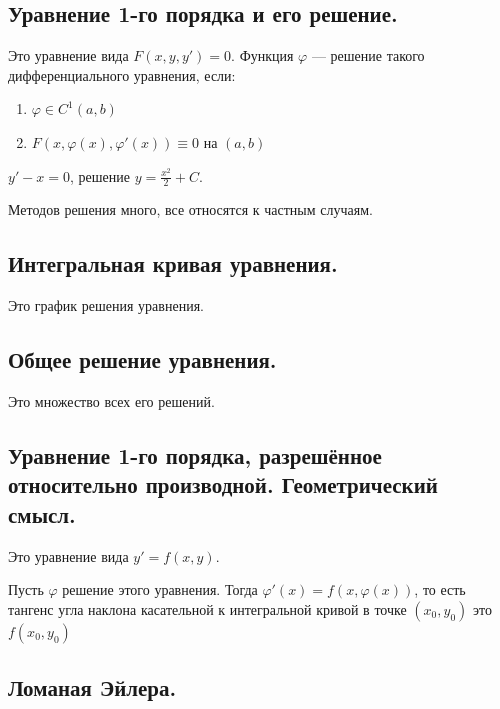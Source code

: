 \subsection*{Уравнение 1-го порядка и его решение.}

Это уравнение вида \(F(x, y, y') = 0\).
Функция \(\varphi\) --- решение такого дифференциального уравнения, если:
\begin{enumerate}
    \item \(\varphi\in C^1(a, b)\)
    \item \(F(x, \varphi(x), \varphi'(x)) \equiv 0\) на \((a, b)\)
\end{enumerate}
\begin{example}
    \(y' - x = 0\), решение \(y = \frac{x^2}{2} + C\).
\end{example}

Методов решения много, все относятся к частным случаям.

\subsection*{Интегральная кривая уравнения.}

Это график решения уравнения.

\subsection*{Общее решение уравнения.}

Это множество всех его решений.

\subsection*{Уравнение 1-го порядка, разрешённое относительно производной. Геометрический смысл.}

Это уравнение вида \(y' = f(x, y)\).

Пусть \(\varphi\) решение этого уравнения. Тогда \(\varphi'(x) = f(x, \varphi(x))\), то есть тангенс угла наклона касательной к интегральной кривой в точке \((x_0, y_0)\) это \(f(x_0, y_0)\)

\subsection*{Ломаная Эйлера.}

